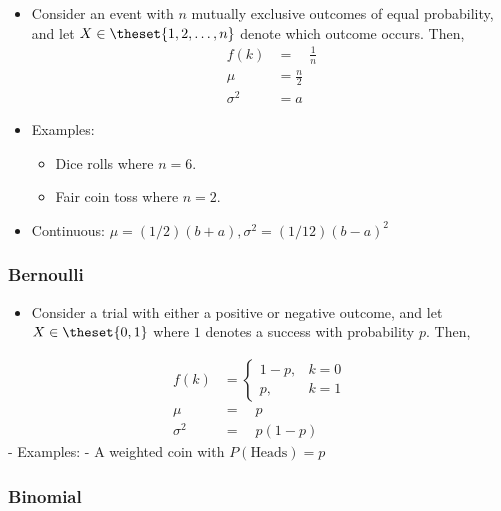 \begin{itemize}
\tightlist
\item
  Consider an event with \(n\) mutually exclusive outcomes of equal
  probability, and let \(X \in \theset{1,2,\ldots, n}\) denote which
  outcome occurs. Then,
  \begin{align*}
  f(k)            &= \quad \frac 1 n \\
  \mu             &= \frac n 2 \\
  \sigma^2    &= a
  \end{align*}
\item
  Examples:

  \begin{itemize}
  \tightlist
  \item
    Dice rolls where \(n=6\).
  \item
    Fair coin toss where \(n=2\).
  \end{itemize}
\item
  Continuous: \(\mu = (1/2)(b+a), \sigma^2 = (1/12)(b-a)^2\)
\end{itemize}

\hypertarget{bernoulli}{%
\subsubsection{Bernoulli}\label{bernoulli}}

\begin{itemize}
\tightlist
\item
  Consider a trial with either a positive or negative outcome, and let
  \(X \in\theset{0,1}\) where \(1\) denotes a success with probability
  \(p\). Then,
\end{itemize}

\begin{align*}
f(k)            &= 
\begin{cases}
1-p,        & k = 0 \\
p,          & k = 1
\end{cases} \\
\mu             &= \quad p \\
\sigma^2    &= \quad p(1-p)
\end{align*} - Examples: - A weighted coin with \(P(\text{Heads}) = p\)

\hypertarget{binomial}{%
\subsubsection{Binomial}\label{binomial}}


